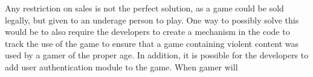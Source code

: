 \textcolor{ProcessBlue}{Any restriction on sales is not the perfect solution, as a game could be sold legally, but given to an underage person to play.} One way to possibly solve this would be to also require the developers to create a mechanism in the code to track the use of the game to ensure that a game containing violent content was used by a gamer of the proper age. In addition, it is possible for the developers to add user authentication module to the game. When gamer will 


